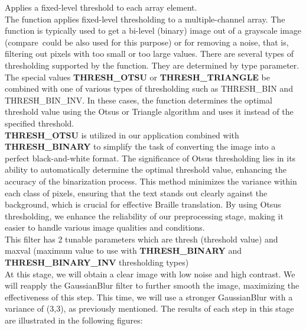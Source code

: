 \quad Applies a fixed-level threshold to each array element.\\

\quad The function applies fixed-level thresholding to a multiple-channel
array. The function is typically used to get a bi-level (binary) image
out of a grayscale image (compare~could be also used for this purpose)
or for removing a noise, that is, filtering out pixels with too small or
too large values. There are several types of thresholding supported by
the function. They are determined by type parameter.\\

\quad The special
values \textbf{THRESH\_OTSU} or \textbf{THRESH\_TRIANGLE}
be combined with one of various types of thresholding such as THRESH\_BIN and\\ THRESH\_BIN\_INV. In these cases, the function
determines the optimal threshold value using the Otsu\textquotesingle s
or Triangle algorithm and uses it instead of the specified threshold.\\

\quad \textbf{THRESH\_OTSU} is utilized in our application combined with\\ 
\textbf{THRESH\_BINARY} to simplify the task of converting the image
into a perfect black-and-white format. The significance of
Otsu\textquotesingle s thresholding lies in its ability to automatically
determine the optimal threshold value, enhancing the accuracy of the
binarization process. This method minimizes the variance within each
class of pixels, ensuring that the text stands out clearly against the
background, which is crucial for effective Braille translation. By using
Otsu\textquotesingle s thresholding, we enhance the reliability of our
preprocessing stage, making it easier to handle various image qualities
and conditions.\\

\quad This filter has 2 tunable parameters which are thresh (threshold value)
and maxval (maximum value to use with \textbf{THRESH\_BINARY} and \\
\textbf{THRESH\_BINARY\_INV} thresholding types)\\

\quad At this stage, we will obtain a clear image with low noise and high
contrast. We will reapply the GaussianBlur filter to further smooth the
image, maximizing the effectiveness of this step. This time, we will use
a stronger GaussianBlur with a variance of (3,3), as previously
mentioned. The results of each step in this stage are illustrated in the
following figures:  \\

